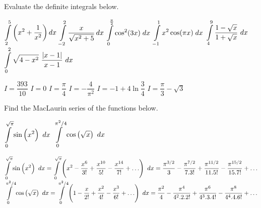 \begin{Exercise} 
Evaluate the definite integrals below. 
	\begin{multicols}{2}
	\ifcalculus
	\Question[difficulty = 1] $\displaystyle \int\limits_2^5 \left(x^2+\dfrac{1}{x^2}\right) dx$
	\Question[difficulty = 1] $\displaystyle \int\limits_{-2}^2 \dfrac{x}{\sqrt{x^2+5}}\, dx$
	\Question[difficulty = 1] $\displaystyle \int\limits_0^{\frac{\pi}{2}} \cos^2(3x)\; dx$
	\Question[difficulty = 1] $\displaystyle \int\limits_{-1}^1 x^2\cos(\pi x)\; dx$
	\fi
	\ifanalysis\Question[difficulty = 1]\fi\ifcalculus\Question[difficulty = 2]\fi  $\displaystyle \int\limits_4^9  \dfrac{1-\sqrt{x}}{1+\sqrt{x}}\ dx$
	\Question[difficulty = 2]  $\ds \int\limits_0^2  \sqrt{4-x^2} \ \dfrac{|x-1|}{x-1}\ dx$
	\EndCurrentQuestion
	\end{multicols}
\end{Exercise}

\begin{Answer}
    
    \begin{multicols}{2}
    \Question $I= \dfrac{393}{10}$
    \Question $I= 0$
    \Question $I= \dfrac{\pi}{4}$
    \Question $I= -\dfrac{4}{\pi^2}$
    \Question $I=-1+4 \ln \dfrac{3}{4}$
    \Question $I=\dfrac{\pi}{3} - \sqrt{3}$
    \EndCurrentQuestion
    \end{multicols}
\end{Answer}




\ifcalculus \pagebreak \fi

\begin{Exercise} Find the MacLaurin series of the functions below. 
\begin{multicols}{2}
    \Question[difficulty = 2] $\displaystyle \int\limits_0^{\sqrt{\pi}} \sin \left(x^2\right)\ dx$
    \Question[difficulty = 2] $\displaystyle \int\limits_0^{\pi^2/4} \cos \left(\sqrt{x}\right)\ dx$
    \EndCurrentQuestion
\end{multicols}
\end{Exercise}

\begin{Answer}
    
         \Question $\displaystyle \int\limits_0^{\sqrt{\pi}} \sin \left(x^2\right)\ dx = \displaystyle \int\limits_0^{\sqrt{\pi}} \left( x^2 - \dfrac{x^6}{3!} + \dfrac{x^{10}}{5!} - \dfrac{x^{14}}{7!} + \ldots  \right)\ dx  =  \dfrac{\pi^{3/2}}{3} - \dfrac{\pi^{7/2}}{7.3!} +\dfrac{\pi^{11/2}}{11.5!} - \dfrac{\pi^{15/2}}{15.7!} + \ldots $ 
        \Question $\displaystyle \int\limits_0^{\pi^2/4} \cos \left(\sqrt{x}\right)\ dx = \displaystyle \int\limits_0^{\pi^2/4} \left(1 - \dfrac{x}{2!} + \dfrac{x^2}{4!} - \dfrac{x^3}{6!} + \ldots \right)\ dx =  \dfrac{\pi^{2}}{4} - \dfrac{\pi^{4}}{4^2.2.2!} +\dfrac{\pi^{6}}{4^3.3.4!} - \dfrac{\pi^{8}}{4^4.4.6!} + \ldots $ 
    
\end{Answer}


